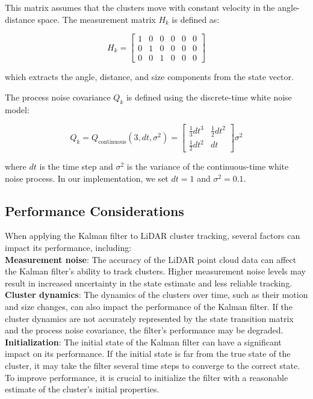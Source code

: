 \documentclass[journal]{IEEEtran} %
\begin{document}
This matrix assumes that the clusters move with constant velocity in the angle-distance space. The measurement matrix $H_k$ is defined as:

\[
H_k = \begin{bmatrix}
1 & 0 & 0 & 0 & 0 & 0 \\
0 & 1 & 0 & 0 & 0 & 0 \\
0 & 0 & 1 & 0 & 0 & 0
\end{bmatrix}
\]

which extracts the angle, distance, and size components from the state vector.

The process noise covariance $Q_k$ is defined using the discrete-time white noise model:

\[
Q_k = Q_{\text{continuous}}(3, dt, \sigma^2) =
\begin{bmatrix}
\frac{1}{3}dt^3 & \frac{1}{2}dt^2 \\
\frac{1}{2}dt^2 & dt
\end{bmatrix} \sigma^2
\]

where $dt$ is the time step and $\sigma^2$ is the variance of the continuous-time white noise process. In our implementation, we set $dt = 1$ and $\sigma^2 = 0.1$.

\subsection{Performance Considerations}

When applying the Kalman filter to LiDAR cluster tracking, several factors can impact its performance, including:\\

\textbf{Measurement noise}: The accuracy of the LiDAR point cloud data can affect the Kalman filter's ability to track clusters. Higher measurement noise levels may result in increased uncertainty in the state estimate and less reliable tracking.\\

\textbf{Cluster dynamics}: The dynamics of the clusters over time, such as their motion and size changes, can also impact the performance of the Kalman filter. If the cluster dynamics are not accurately represented by the state transition matrix and the process noise covariance, the filter's performance may be degraded.\\

\textbf{Initialization}: The initial state of the Kalman filter can have a significant impact on its performance. If the initial state is far from the true state of the cluster, it may take the filter several time steps to converge to the correct state. To improve performance, it is crucial to initialize the filter with a reasonable estimate of the cluster's initial properties.\\
\end{document}
